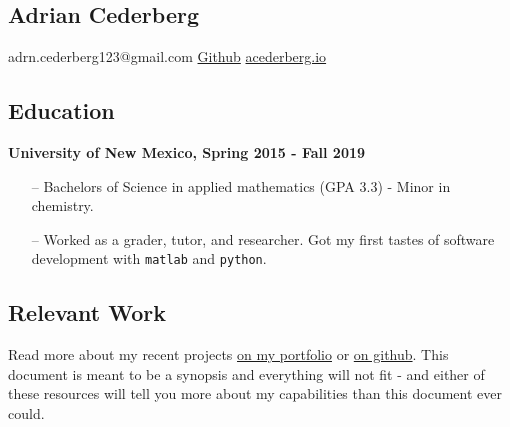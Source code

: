 \documentclass{article}
\begin{document}
\newcommand{\chapsubhead}[1]{{ \begin{center}\Large #1 \vspace{2ex} \end{center} }}
\providecommand{\tightlist}{%
  \setlength{\itemsep}{0pt}\setlength{\parskip}{0pt}}
\label{adrian-cederberg}

\begin{center}
    \section*{Adrian Cederberg}
\end{center}

\chapsubhead{
    adrn.cederberg123@gmail.com
    \textbar{} \href{https://github.com/acederberg}{Github} \textbar{}
    \href{https://acederberg.io}{acederberg.io}
}

\begin{center}
\section*{Education}\label{education}
\end{center}
\textbf{University of New Mexico, Spring 2015 - Fall 2019}
\begin{itemize}
\tightlist
\item[--]
  Bachelors of Science in applied mathematics (GPA 3.3) - Minor in chemistry.
\item[--]
  Worked as a grader, tutor, and researcher. Got my first tastes of software development with \texttt{matlab} and \texttt{python}.
\end{itemize}


\begin{center}
    \section*{Relevant Work}\label{relevant-work}
\end{center}

Read more about my recent projects \href{https://acederberg.io/home}{on my portfolio} or \href{https://github.com/acederberg}{on github}. This document is meant to be a synopsis and everything will not fit - and either of these resources will tell you more about my capabilities than this document ever could.
\end{document}
